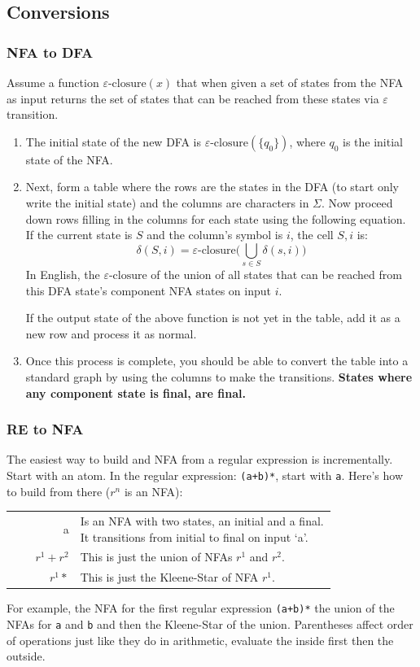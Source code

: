 \subsection{Conversions}
\newcommand{\eclose}{\varepsilon\text{-closure}}
\subsubsection{NFA to DFA}
Assume a function $\eclose(x)$ that when given a set of states from the
NFA as input returns the set of states that can be reached from these states
via $\varepsilon$ transition.
\begin{enumerate}
    \item The initial state of the new DFA is $\eclose(\{q_0\})$, where $q_0$ is
    the initial state of the NFA.
    \item Next, form a table where the rows are the states in the DFA (to start
    only write the initial state) and the columns are characters in $\Sigma$.
    Now proceed down rows filling in the columns for each state using the following
    equation. If the current state is $S$ and the column's symbol is $i$,
    the cell $S, i$ is:
    \[
        \delta(S, i) = \eclose\big(\bigcup_{s \in S} \delta(s, i)\big)
    \]
    In English, the $\eclose$ of the union of all states that can be reached 
    from this DFA state's component NFA states on input $i$.

    If the output state of the above function is not yet in the table, add it
    as a new row and process it as normal.
    \item Once this process is complete, you should be able to convert the
    table into a standard graph by using the columns to make the transitions.
    \textbf{States where any component state is final, are final.}
\end{enumerate}
\subsubsection{RE to NFA}
The easiest way to build and NFA from a regular expression is incrementally. Start
with an atom. In the regular expression: \verb|(a+b)*|, start with \verb|a|. Here's
how to build from there ($r^n$ is an NFA):
\begin{tabular}{rp{0.79\linewidth}}
a & Is an NFA with two states, an initial and a final. It transitions from initial
    to final on input `a'. \\
$r^1 + r^2$ & This is just the union of NFAs $r^1$ and $r^2$. \\
$r^1*$ & This is just the Kleene-Star of NFA $r^1$. \\
\end{tabular}
For example, the NFA for the first
regular expression \verb|(a+b)*| the union of the NFAs for \verb|a| and \verb|b|
and then the Kleene-Star of the union. Parentheses affect order of operations
just like they do in arithmetic, evaluate the inside first then the outside.

